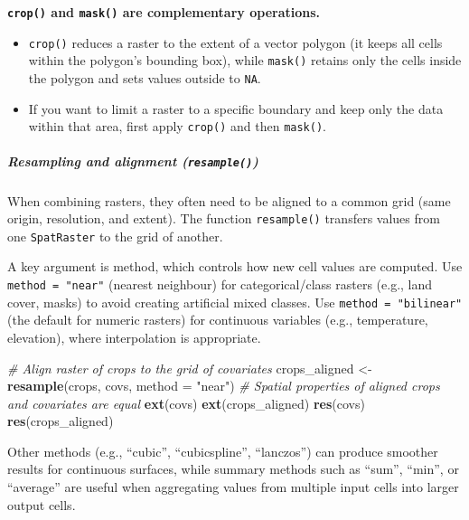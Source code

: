 \documentclass[
  10pt,
  b5paper,
  oneside]{book}
\newenvironment{Shaded}{\begin{snugshade}}{\end{snugshade}}
\newcommand{\AttributeTok}[1]{\textcolor[rgb]{0.13,0.29,0.53}{#1}}
\newcommand{\CommentTok}[1]{\textcolor[rgb]{0.56,0.35,0.01}{\textit{#1}}}
\newcommand{\FunctionTok}[1]{\textcolor[rgb]{0.13,0.29,0.53}{\textbf{#1}}}
\newcommand{\NormalTok}[1]{#1}
\newcommand{\OtherTok}[1]{\textcolor[rgb]{0.56,0.35,0.01}{#1}}
\newcommand{\StringTok}[1]{\textcolor[rgb]{0.31,0.60,0.02}{#1}}
\begin{document}
\textbf{\texttt{crop()} and \texttt{mask()} are complementary operations.}

\begin{itemize}
\item
  \texttt{crop()} reduces a raster to the extent of a vector polygon (it keeps all cells within the polygon's bounding box), while \texttt{mask()} retains only the cells inside the polygon and sets values outside to \texttt{NA}.
\item
  If you want to limit a raster to a specific boundary and keep only the data within that area, first apply \texttt{crop()} and then \texttt{mask()}.
\end{itemize}

\subparagraph*{\texorpdfstring{Resampling and alignment (\texttt{resample()})}{Resampling and alignment (resample())}}\label{resampling-and-alignment-resample}

When combining rasters, they often need to be aligned to a common grid (same origin, resolution, and extent). The function \texttt{resample()} transfers values from one \texttt{SpatRaster} to the grid of another.

A key argument is method, which controls how new cell values are computed. Use \texttt{method\ =\ "near"} (nearest neighbour) for categorical/class rasters (e.g., land cover, masks) to avoid creating artificial mixed classes. Use \texttt{method\ =\ "bilinear"} (the default for numeric rasters) for continuous variables (e.g., temperature, elevation), where interpolation is appropriate.

\begin{Shaded}
\begin{Highlighting}[]
\CommentTok{\# Align raster of crops to the grid of covariates}
\NormalTok{ crops\_aligned }\OtherTok{\textless{}{-}} \FunctionTok{resample}\NormalTok{(crops, covs, }\AttributeTok{method =} \StringTok{"near"}\NormalTok{)}
\CommentTok{\# Spatial properties of aligned crops and covariates are equal}
\FunctionTok{ext}\NormalTok{(covs)}
\FunctionTok{ext}\NormalTok{(crops\_aligned)}
\FunctionTok{res}\NormalTok{(covs)}
\FunctionTok{res}\NormalTok{(crops\_aligned)}
\end{Highlighting}
\end{Shaded}

Other methods (e.g., ``cubic'', ``cubicspline'', ``lanczos'') can produce smoother results for continuous surfaces, while summary methods such as ``sum'', ``min'', or ``average'' are useful when aggregating values from multiple input cells into larger output cells.
\end{document}
